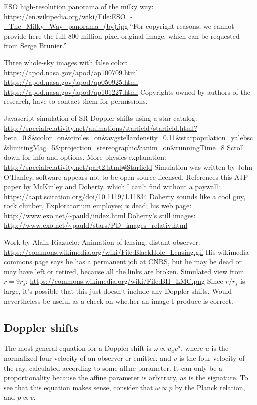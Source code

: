 \documentclass{article}
\begin{document}
ESO high-resolution panorama of the milky way:
\url{https://en.wikipedia.org/wiki/File:ESO_-_The_Milky_Way_panorama_(by).jpg}
``For copyright reasons, we cannot provide here the full 800-million-pixel original image, which can be requested from Serge Brunier.''

Three whole-sky images with false color:
\url{https://apod.nasa.gov/apod/ap100709.html}
\url{https://apod.nasa.gov/apod/ap050925.html}
\url{https://apod.nasa.gov/apod/ap101227.html}
Copyrights owned by authors of the research, have to contact them for permissions.

Javascript simulation of SR Doppler shifts using a star catalog:
\url{http://specialrelativity.net/animations/starfield/starfield.html?beta=0.8&color=on&circles=on&avgstellardensity=0.11&starpopulation=yalebsc&limitingMag=5&projection=stereographic&anim=on&runningTime=8}
Scroll down for info and options.
More physics explanation: \url{http://specialrelativity.net/part2.html#Starfield}
Simulation was written by John O'Hanley, software appears not to be open-source licensed.
References this AJP paper by McKinley and Doherty, which I can't find without a paywall:
\url{https://aapt.scitation.org/doi/10.1119/1.11834} Doherty sounds like a cool guy, rock
climber, Exploratorium employee; is dead; his web page: \url{http://www.exo.net/~pauld/index.html}
Doherty's still images: \url{http://www.exo.net/~pauld/stars/PD_images_relativ.html}

Work by Alain Riazuelo: Animation of lensing,
distant observer: \url{https://commons.wikimedia.org/wiki/File:BlackHole_Lensing.gif}
His wikimedia commons page says he has a permanent job at CNRS, but he may be dead or
may have left or retired, because all the links are broken.
Simulated view from $r=9r_s$: \url{https://commons.wikimedia.org/wiki/File:BH_LMC.png}
Since $r/r_s$ is large, it's possible that this just doesn't include any Doppler shifts.
Would nevertheless be useful as a check on whether an image I produce is correct.

\subsection{Doppler shifts}

The most general equation for a Doppler shift is $\omega \propto u_av^a$, where $u$ is the normalized
four-velocity of an observer or emitter, and $v$ is the four-velocity of the ray, calculated according
to some affine parameter. It can only be a proportionality because the affine parameter is arbitrary,
as is the signature. To see that this equation makes sense, consider that $\omega\propto p$ by
the Planck relation, and $p\propto v$.
\end{document}
